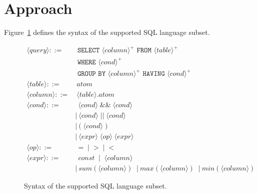 
\section{Approach}
\label{sec:approach}

Figure~\ref{fig:syntax} defines the syntax of the supported
SQL language subset.

\newcommand{\q}{\langle query\rangle}
\newcommand{\db}{\langle db\rangle}
\newcommand{\pat}{\langle pat\rangle}
\newcommand{\bug}{\langle bug\rangle}
\newcommand{\dist}{\langle distance\rangle}
\newcommand{\sem}[1]{\llbracket #1\rrbracket}
\newcommand{\lit}[1]{\texttt{#1}}

\newcommand{\column}{\langle column\rangle}
\newcommand{\dbtable}{\langle table\rangle}
\newcommand{\cond}{\langle cond\rangle}
\newcommand{\op}{\langle op\rangle}
\newcommand{\e}{\langle expr\rangle}

\begin{figure}[t]
\footnotesize%
\begin{align*}
\q ::= {} 
	& \texttt{ SELECT } \column^+ \texttt{ FROM } \dbtable^+ \\
        & \texttt{ WHERE } \cond^+ \\ 
	&  \texttt{ GROUP BY } \column^+ \texttt{ HAVING } \cond^+\\
\dbtable::= {} &\ atom \\
\column ::= {} &\ \dbtable.atom\\
\cond ::= {} &\ \ \cond \;\texttt{\&\&}\; \cond \\ 
    & |\ \cond \;\texttt{||}\; \cond \\
    & |\ \texttt{(}\;\cond\;\texttt{)} \\
    & |\ \e \;\op\; \e \\
\op ::= {} &\ \ \texttt{=} \;\;|\;\; \texttt{>}  \;\;|\;\; \texttt{<}\\
\e ::= {} &\ \ const \;\;|\;\; \column  \;\; \\
    & |\ sum(\column) \;\;|\ max(\column) \;\;|\ min(\column) 
\end{align*}
\normalsize%
\caption{Syntax of the supported SQL language subset.}
\label{fig:syntax}
\end{figure}
